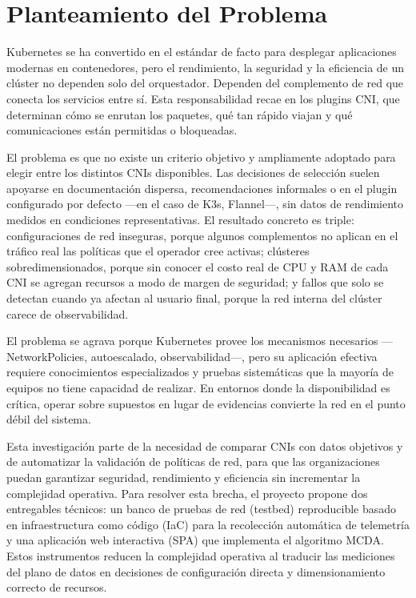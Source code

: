 \chapter{Planteamiento del Problema} \label{sec:Planteamiento}

Kubernetes se ha convertido en el estándar de facto para desplegar aplicaciones modernas en contenedores, pero el rendimiento, la seguridad y la eficiencia de un clúster no dependen solo del orquestador. Dependen del complemento de red que conecta los servicios entre sí. Esta responsabilidad recae en los plugins CNI, que determinan cómo se enrutan los paquetes, qué tan rápido viajan y qué comunicaciones están permitidas o bloqueadas.

El problema es que no existe un criterio objetivo y ampliamente adoptado para elegir entre los distintos CNIs disponibles. Las decisiones de selección suelen apoyarse en documentación dispersa, recomendaciones informales o en el plugin configurado por defecto ---en el caso de K3s, Flannel---, sin datos de rendimiento medidos en condiciones representativas. El resultado concreto es triple: configuraciones de red inseguras, porque algunos complementos no aplican en el tráfico real las políticas que el operador cree activas; clústeres sobredimensionados, porque sin conocer el costo real de CPU y RAM de cada CNI se agregan recursos a modo de margen de seguridad; y fallos que solo se detectan cuando ya afectan al usuario final, porque la red interna del clúster carece de observabilidad.

El problema se agrava porque Kubernetes provee los mecanismos necesarios ---NetworkPolicies, autoescalado, observabilidad---, pero su aplicación efectiva requiere conocimientos especializados y pruebas sistemáticas que la mayoría de equipos no tiene capacidad de realizar. En entornos donde la disponibilidad es crítica, operar sobre supuestos en lugar de evidencias convierte la red en el punto débil del sistema.

Esta investigación parte de la necesidad de comparar CNIs con datos objetivos y de automatizar la validación de políticas de red, para que las organizaciones puedan garantizar seguridad, rendimiento y eficiencia sin incrementar la complejidad operativa. Para resolver esta brecha, el proyecto propone dos entregables técnicos: un banco de pruebas de red (testbed) reproducible basado en infraestructura como código (IaC) para la recolección automática de telemetría y una aplicación web interactiva (SPA) que implementa el algoritmo MCDA. Estos instrumentos reducen la complejidad operativa al traducir las mediciones del plano de datos en decisiones de configuración directa y dimensionamiento correcto de recursos.
